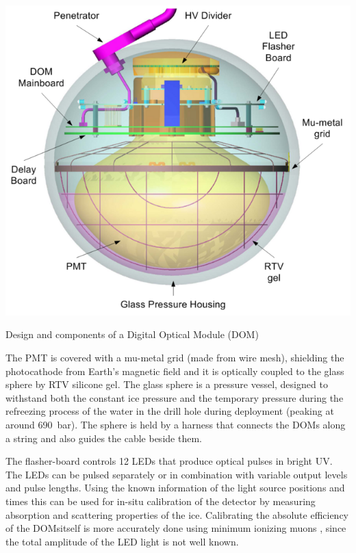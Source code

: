 \begin{marginfigure}
    \includegraphics{figures/icecube_deepcore/DOM_schematic.png}
	\caption[Digital Optical Module (DOM)]{Design and components of a Digital Optical Module (DOM) \cite{ABBASI2009294_data_acquisition}}
\end{marginfigure}

The PMT is covered with a mu-metal grid (made from wire mesh), shielding the photocathode from Earth's magnetic field and it is optically coupled to the glass sphere by RTV silicone gel. The glass sphere is a pressure vessel, designed to withstand both the constant ice pressure and the temporary pressure during the refreezing process of the water in the drill hole during deployment (peaking at around \SI{690}{\bar}). The sphere is held by a harness that connects the DOMs along a string and also guides the cable beside them.

The flasher-board controls 12 LEDs that produce optical pulses in bright UV. The LEDs can be pulsed separately or in combination with variable output levels and pulse lengths. Using the known information of the light source positions and times this can be used for in-situ calibration of the detector by measuring absorption and scattering properties of the ice. Calibrating the absolute efficiency of the DOMsitself is more accurately done using minimum ionizing muons , since the total amplitude of the LED light is not well known.


